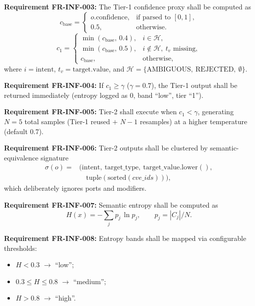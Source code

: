 \documentclass[10pt,journal,onecolumn]{IEEEtran}
\newcommand{\reqid}[1]{\textbf{#1}}
\begin{document}
\reqid{Requirement FR-INF-003:} The Tier-1 confidence proxy shall be computed as
\begin{equation}
c_{\mathrm{base}} = \begin{cases} o.\mathrm{confidence}, & \text{if parsed to } [0,1],\\ 0.5, & \text{otherwise.} \end{cases}
\end{equation}
\begin{equation}
c_{1} = \begin{cases} \min(c_{\mathrm{base}},\,0.4), & i \in \mathcal{H},\\ \min(c_{\mathrm{base}},\,0.5), & i \notin \mathcal{H},\ t_{v} \text{ missing},\\ c_{\mathrm{base}}, & \text{otherwise,} \end{cases}
\end{equation}
where $i = \mathrm{intent}$, $t_{v} = \mathrm{target.value}$, and $\mathcal{H} = \{\mathrm{AMBIGUOUS},\ \mathrm{REJECTED},\ \emptyset\}$.

\reqid{Requirement FR-INF-004:} If $c_{1} \geq \gamma$ ($\gamma = 0.7$), the Tier-1 output shall be returned immediately (entropy logged as 0, band ``low'', tier ``1'').

\reqid{Requirement FR-INF-005:} Tier-2 shall execute when $c_{1} < \gamma$, generating $N=5$ total samples (Tier-1 reused $+$ $N-1$ resamples) at a higher temperature (default 0.7).

\reqid{Requirement FR-INF-006:} Tier-2 outputs shall be clustered by semantic-equivalence signature
\begin{equation}
\begin{aligned}
\sigma(o) ={}& \bigl(\mathrm{intent},\ \mathrm{target\_type},\ \mathrm{target\_value.lower()},\\
&\quad \mathrm{tuple}(\mathrm{sorted}(cve\_ids))\bigr),
\end{aligned}
\end{equation}
which deliberately ignores ports and modifiers.

\reqid{Requirement FR-INF-007:} Semantic entropy shall be computed as
\begin{equation}
H(x) = -\sum_{j} p_{j}\, \ln p_{j}, \qquad p_{j} = |C_{j}|/N.
\end{equation}

\reqid{Requirement FR-INF-008:} Entropy bands shall be mapped via configurable thresholds:
\begin{itemize}
\item $H < 0.3$ $\rightarrow$ ``low'';
\item $0.3 \leq H \leq 0.8$ $\rightarrow$ ``medium'';
\item $H > 0.8$ $\rightarrow$ ``high''.
\end{itemize}
\end{document}
